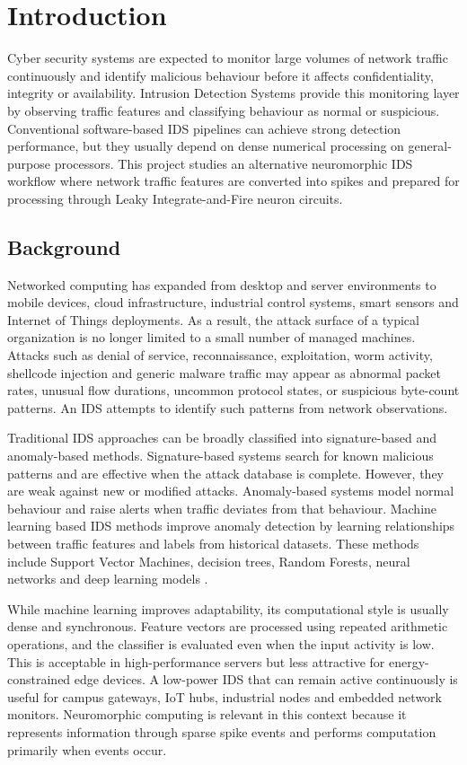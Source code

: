 \chapter{Introduction}

Cyber security systems are expected to monitor large volumes of network traffic continuously and identify malicious behaviour before it affects confidentiality, integrity or availability. Intrusion Detection Systems provide this monitoring layer by observing traffic features and classifying behaviour as normal or suspicious. Conventional software-based IDS pipelines can achieve strong detection performance, but they usually depend on dense numerical processing on general-purpose processors. This project studies an alternative neuromorphic IDS workflow where network traffic features are converted into spikes and prepared for processing through Leaky Integrate-and-Fire neuron circuits.

\section[Background]{\textbf{Background}}

Networked computing has expanded from desktop and server environments to mobile devices, cloud infrastructure, industrial control systems, smart sensors and Internet of Things deployments. As a result, the attack surface of a typical organization is no longer limited to a small number of managed machines. Attacks such as denial of service, reconnaissance, exploitation, worm activity, shellcode injection and generic malware traffic may appear as abnormal packet rates, unusual flow durations, uncommon protocol states, or suspicious byte-count patterns. An IDS attempts to identify such patterns from network observations.

Traditional IDS approaches can be broadly classified into signature-based and anomaly-based methods. Signature-based systems search for known malicious patterns and are effective when the attack database is complete. However, they are weak against new or modified attacks. Anomaly-based systems model normal behaviour and raise alerts when traffic deviates from that behaviour. Machine learning based IDS methods improve anomaly detection by learning relationships between traffic features and labels from historical datasets. These methods include Support Vector Machines, decision trees, Random Forests, neural networks and deep learning models \cite{Buczak2016}.

While machine learning improves adaptability, its computational style is usually dense and synchronous. Feature vectors are processed using repeated arithmetic operations, and the classifier is evaluated even when the input activity is low. This is acceptable in high-performance servers but less attractive for energy-constrained edge devices. A low-power IDS that can remain active continuously is useful for campus gateways, IoT hubs, industrial nodes and embedded network monitors. Neuromorphic computing is relevant in this context because it represents information through sparse spike events and performs computation primarily when events occur.

